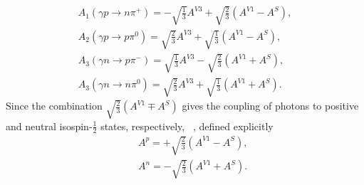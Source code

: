 \begin{align}
A_1(\gamma p \to n \pi^+) = -\sqrt{\frac{1}{3}}A^{V3} + \sqrt{\frac{2}{3}}(A^{V1} - A^{S}),\\
A_2(\gamma p \to p \pi^0) = \sqrt{\frac{2}{3}} A^{V3} + \sqrt{\frac{1}{3}}(A^{V1}-A^{S}),\\
A_3(\gamma n \to p \pi^-) = \sqrt{\frac{1}{3}}A^{V3} - \sqrt{\frac{2}{3}}(A^{V1} + A^{S}),\\
A_3(\gamma n \to n \pi^0) = \sqrt{\frac{2}{3}}A^{V3} + \sqrt{\frac{1}{3}}(A^{V1} + A^{S}).
\end{align}
Since the combination $\sqrt{\frac{2}{3}}(A^{V1} \mp A^{S})$ gives the coupling of photons to positive and neutral isospin-$\frac{1}{2}$ states, respectively, ~\protect\cite{Rosenfeld}, defined explicitly
%
\begin{align}
&&A^p = + \sqrt{\frac{2}{3}}(A^{V1} - A^{S}),\\
&&A^n = -\sqrt{\frac{2}{3}}(A^{V1} + A^{S}).
\end{align}
